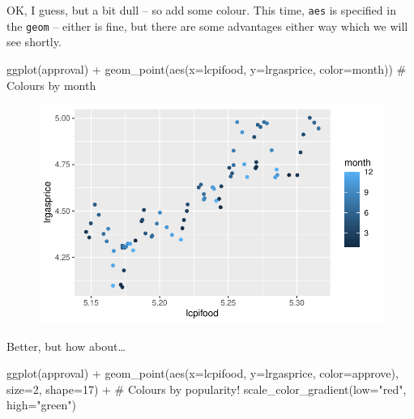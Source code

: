 \documentclass[
  letterpaper,
]{book}
\newenvironment{Shaded}{\begin{snugshade}}{\end{snugshade}}
\newcommand{\AttributeTok}[1]{\textcolor[rgb]{0.40,0.45,0.13}{#1}}
\newcommand{\CommentTok}[1]{\textcolor[rgb]{0.37,0.37,0.37}{#1}}
\newcommand{\DecValTok}[1]{\textcolor[rgb]{0.68,0.00,0.00}{#1}}
\newcommand{\FunctionTok}[1]{\textcolor[rgb]{0.28,0.35,0.67}{#1}}
\newcommand{\NormalTok}[1]{\textcolor[rgb]{0.00,0.23,0.31}{#1}}
\newcommand{\SpecialCharTok}[1]{\textcolor[rgb]{0.37,0.37,0.37}{#1}}
\newcommand{\StringTok}[1]{\textcolor[rgb]{0.13,0.47,0.30}{#1}}
\begin{document}
OK, I guess, but a bit dull -- so add some colour. This time,
\texttt{aes} is specified in the \texttt{geom} -- either is fine, but
there are some advantages either way which we will see shortly.

\begin{Shaded}
\begin{Highlighting}[]
\FunctionTok{ggplot}\NormalTok{(approval) }\SpecialCharTok{+}
  \FunctionTok{geom\_point}\NormalTok{(}\FunctionTok{aes}\NormalTok{(}\AttributeTok{x=}\NormalTok{lcpifood, }\AttributeTok{y=}\NormalTok{lrgasprice, }\AttributeTok{color=}\NormalTok{month))  }\CommentTok{\# Colours by month}
\end{Highlighting}
\end{Shaded}

\begin{figure}[H]

{\centering \includegraphics{Appendix1_files/figure-pdf/p2-1.pdf}

}

\end{figure}

Better, but how about\ldots{}

\begin{Shaded}
\begin{Highlighting}[]
\FunctionTok{ggplot}\NormalTok{(approval) }\SpecialCharTok{+}
  \FunctionTok{geom\_point}\NormalTok{(}\FunctionTok{aes}\NormalTok{(}\AttributeTok{x=}\NormalTok{lcpifood, }\AttributeTok{y=}\NormalTok{lrgasprice, }\AttributeTok{color=}\NormalTok{approve), }\AttributeTok{size=}\DecValTok{2}\NormalTok{, }\AttributeTok{shape=}\DecValTok{17}\NormalTok{) }\SpecialCharTok{+} \CommentTok{\# Colours by popularity!}
  \FunctionTok{scale\_color\_gradient}\NormalTok{(}\AttributeTok{low=}\StringTok{"red"}\NormalTok{, }\AttributeTok{high=}\StringTok{"green"}\NormalTok{) }
\end{Highlighting}
\end{Shaded}
\end{document}
